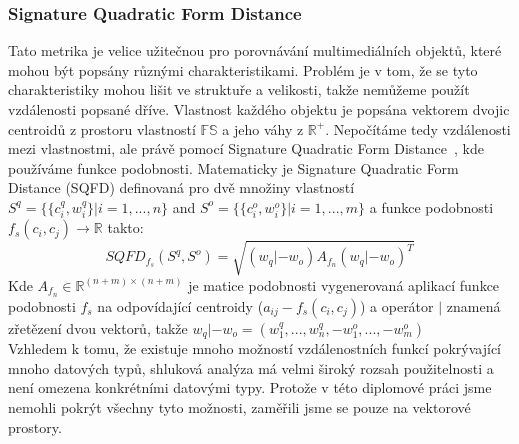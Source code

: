 \subsubsection{Signature Quadratic Form Distance}
Tato metrika je velice užitečnou pro porovnávání multimediálních objektů, které mohou být popsány různými charakteristikami. Problém je v tom, že se tyto charakteristiky mohou lišit ve struktuře a velikosti, takže nemůžeme použít vzdálenosti popsané dříve. Vlastnost každého objektu je popsána vektorem dvojic centroidů z prostoru vlastností $\mathbb{FS}$ a jeho váhy z $\mathbb{R^{+}}$.
Nepočítáme tedy vzdálenosti mezi vlastnostmi, ale právě pomocí Signature Quadratic Form Distance~\cite{Beecks10}, kde používáme funkce podobnosti.
Matematicky je Signature Quadratic Form Distance (SQFD) definovaná pro dvě množiny vlastností $S^{q} = \{\{c_i^q, w_i^q\}|i=1,...,n\}$ and $S^{o} = \{\{c_i^o, w_i^o\}|i=1,...,m\}$ a funkce podobnosti $f_s(c_i, c_j)\to \mathbb{R}$ takto:
$$SQFD_{f_s}(S^q,S^o)=\sqrt{(w_q|-w_o)A_{f_n}(w_q|-w_o)^T}$$
Kde $A_{f_n} \in \mathbb{R}^{(n+m)\times(n+m)}$ je matice podobnosti vygenerovaná aplikací funkce podobnosti $f_s$ na odpovídající centroidy  ($a_{ij}-f_s(c_i,c_j)$) a operátor $|$ znamená zřetězení dvou vektorů, takže $w_q|-w_o = (w_1^q,...,w_n^q,-w_1^o,...,-w_m^o)$\\

Vzhledem k tomu, že existuje mnoho možností vzdálenostních funkcí po\-krý\-va\-jí\-cí mnoho datových typů, shluková analýza má velmi široký rozsah použitelnosti a není omezena konkrétními datovými typy. Protože v této diplomové práci jsme nemohli pokrýt všechny tyto možnosti, zaměřili jsme se pouze na vektorové prostory.

